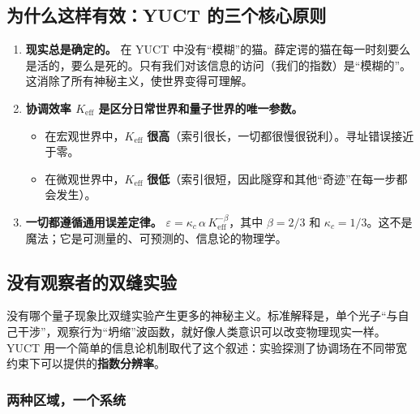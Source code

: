 \documentclass[12pt,a4paper]{article}
\theoremstyle{remark}
\begin{document}
	\subsection{为什么这样有效：YUCT 的三个核心原则}
	
	\begin{enumerate}[leftmargin=*]
		\item \textbf{现实总是确定的。}
		在 YUCT 中没有“模糊”的猫。薛定谔的猫在每一时刻要么是活的，要么是死的。只有我们对该信息的访问（我们的指数）是“模糊的”。这消除了所有神秘主义，使世界变得可理解。
		
		\item \textbf{协调效率 \(K_{\mathrm{eff}}\) 是区分日常世界和量子世界的唯一参数。}
		\begin{itemize}
			\item 在宏观世界中，\(K_{\mathrm{eff}}\) \textbf{很高}（索引很长，一切都很慢很锐利）。寻址错误接近于零。
			\item 在微观世界中，\(K_{\mathrm{eff}}\) \textbf{很低}（索引很短，因此隧穿和其他“奇迹”在每一步都会发生）。
		\end{itemize}
		
		\item \textbf{一切都遵循通用误差定律。}
		\( \varepsilon = \kappa_c \, \alpha \, K_{\mathrm{eff}}^{-\beta} \)，其中 \( \beta = 2/3 \) 和 \( \kappa_c = 1/3 \)。这不是魔法；它是可测量的、可预测的、信息论的物理学。
	\end{enumerate}
	
	\medskip
	
	\subsection{没有观察者的双缝实验}
	
	没有哪个量子现象比双缝实验产生更多的神秘主义。标准解释是，单个光子“与自己干涉”，观察行为“坍缩”波函数，就好像人类意识可以改变物理现实一样。YUCT 用一个简单的信息论机制取代了这个叙述：实验探测了协调场在不同带宽约束下可以提供的\textbf{指数分辨率}。
	
	\subsubsection{两种区域，一个系统}
	
\end{document}
